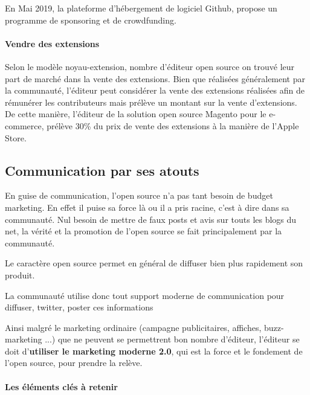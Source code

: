 					En Mai 2019, la plateforme d'hébergement de logiciel Github, propose un programme de sponsoring et de crowdfunding.

				\paragraph{Vendre des extensions\\}

					Selon le modèle noyau-extension, nombre d'éditeur open source on trouvé leur part de marché dans la vente des extensions. Bien que réalisées généralement par la communauté, l'éditeur peut considérer la vente des extensions réalisées afin de rémunérer les contributeurs mais prélève un montant sur la vente d'extensions. De cette manière, l'éditeur de la solution open source Magento pour le e-commerce, prélève 30\% du prix de vente des extensions à la manière de l'Apple Store.

		\subsection{Communication par ses atouts}

			En guise de communication, l'open source n'a pas tant besoin de budget marketing. En effet il puise sa force là ou il a pris racine, c'est à dire dans sa communauté. Nul besoin de mettre de faux posts et avis sur touts les blogs du net, la vérité et la promotion de l'open source se fait principalement par la communauté.

			Le caractère open source permet en général de diffuser bien plus rapidement son produit.

			La communauté utilise donc tout support moderne de communication pour diffuser, twitter, poster ces informations

			Ainsi malgré le marketing ordinaire (campagne publicitaires, affiches, buzz-marketing ...) que ne peuvent se permettrent bon nombre d'éditeur, l'éditeur se doit d'\textbf{utiliser le marketing moderne 2.0}, qui est la force et le fondement de l'open source, pour prendre la relève.

	\paragraph{Les éléments clés à retenir\\}

